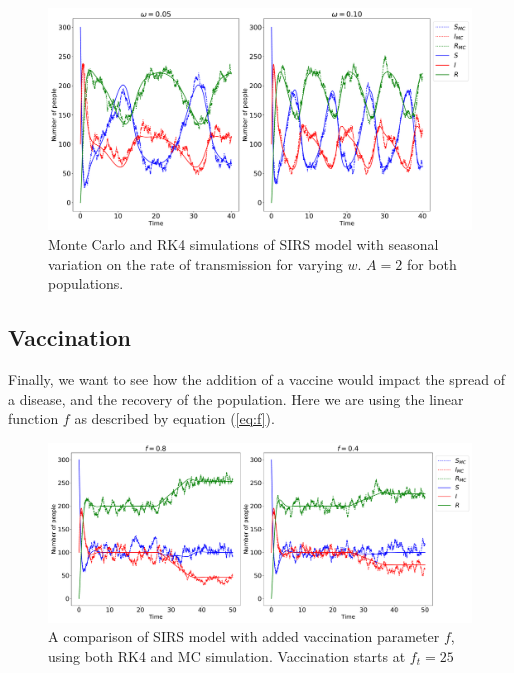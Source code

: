 \documentclass[../main.tex]{subfiles}
\begin{document}
\begin{figure}[!htb]
\centering
\includegraphics[width=\textwidth]{../figures/rk4_vs_mc_sv.pdf}
\caption{Monte Carlo and RK4 simulations of SIRS model with seasonal variation on the rate of transmission for varying $w$. $A = 2$ for both populations.}
\label{fig:mc:seasonal}
\end{figure}


\subsection{Vaccination}
Finally, we want to see how the addition of a vaccine would impact the spread of a disease, and the recovery of the population. Here we are using the linear function $f$ as described by equation (\ref{eq:f}).

\begin{figure}[!htb]
\centering
\includegraphics[width=\textwidth]{../figures/rk4_vs_mc_f.pdf}
\caption{A comparison of SIRS model with added vaccination parameter $f$, using both RK4 and MC simulation. Vaccination starts at $f_t = 25$}
\label{fig:mc:vaccine}
\end{figure}
\end{document}
